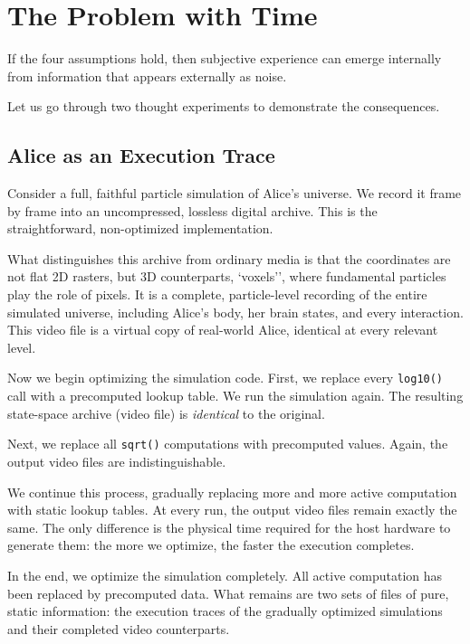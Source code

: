 \chapter{The Problem with Time}
\label{chap:the-problem-with-time}

If the four assumptions hold, then subjective experience can emerge internally from information that appears externally as noise.

Let us go through two thought experiments to demonstrate the consequences.

\section{Alice as an Execution Trace}

Consider a full, faithful particle simulation of Alice's universe. 
We record it frame by frame into an uncompressed, lossless digital archive. 
This is the straightforward, non-optimized implementation.

What distinguishes this archive from ordinary media is that the coordinates are not flat 2D rasters,
but 3D counterparts, `voxels'', where fundamental particles play the role of pixels. 
It is a complete, particle-level recording of the entire simulated universe, including Alice's body, her brain states, and every interaction. 
This video file is a virtual copy of real-world Alice,  identical at every relevant level.

Now we begin optimizing the simulation code. 
First, we replace every \texttt{log10()} call with a precomputed lookup table. 
We run the simulation again. The resulting state-space archive (video file) is \emph{identical} to the original.

Next, we replace all \texttt{sqrt()} computations with precomputed values. 
Again, the output video files are indistinguishable.

We continue this process, gradually replacing more and more active computation with static lookup tables. 
At every run, the output video files remain exactly the same. The only difference is the physical time required
for the host hardware to generate them: the more we optimize, the faster the execution completes.

In the end, we optimize the simulation completely. 
All active computation has been replaced by precomputed data. What remains are two sets of files of pure, static information: 
the execution traces of the gradually optimized simulations and their completed video counterparts.

